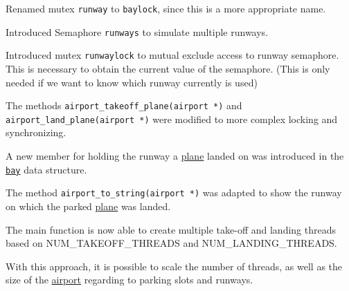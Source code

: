 \documentclass[a4paper, 12pt]{scrartcl} %
\begin{document}
\begin{enum}
\item Renamed mutex \texttt{runway} to \texttt{baylock}, since this is a more
  appropriate name.
\item Introduced Semaphore \texttt{runways} to simulate multiple runways.
\item Introduced mutex \texttt{runwaylock} to mutual exclude access to runway
  semaphore. This is necessary to obtain the current value of the semaphore.
  (This is only needed if we want to know which runway currently is used)
\item The methods \texttt{airport\_takeoff\_plane(airport *)} and
  \texttt{airport\_land\_plane(airport *)} were modified to more complex
  locking and synchronizing.
\item A new member for holding the runway a \hyperref[sec:plane]{plane} landed
  on was introduced in the \texttt{\hyperref[sec:bay]{bay}} data structure.
\item The method \texttt{airport\_to\_string(airport *)} was adapted to show
  the runway on which the parked \hyperref[sec:plane]{plane} was landed.
\item The main function is now able to create multiple take-off and landing
  threads based on NUM\_TAKEOFF\_THREADS and NUM\_LANDING\_THREADS.
\end{enum}

With this approach, it is possible to scale the number of threads, as well as
the size of the \hyperref[sec:airport]{airport} regarding to parking slots and
runways.

%
%
\end{document}
